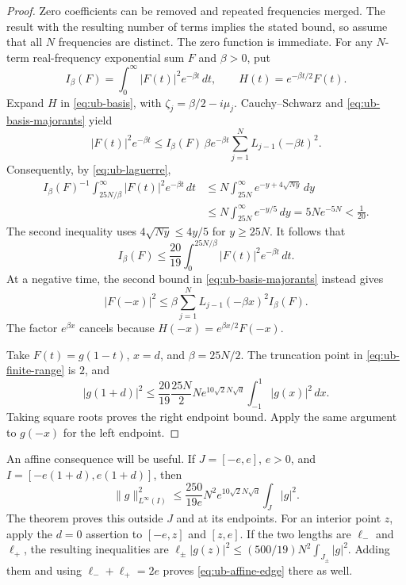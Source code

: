 \begin{proof}
Zero coefficients can be removed and repeated frequencies merged.  The
result with the resulting number of terms implies the stated bound, so
assume that all $N$ frequencies are distinct.  The zero function is
immediate.  For any $N$-term real-frequency exponential sum $F$ and
$\beta>0$, put
\[
 I_\beta(F)=\int_0^\infty|F(t)|^2e^{-\beta t}\,dt,
 \qquad H(t)=e^{-\beta t/2}F(t).
\]
Expand $H$ in \eqref{eq:ub-basis}, with
$\zeta_j=\beta/2-i\mu_j$.  Cauchy--Schwarz and
\eqref{eq:ub-basis-majorants} yield
\[
 |F(t)|^2e^{-\beta t}
 \le I_\beta(F)\,\beta e^{-\beta t}
              \sum_{j=1}^N L_{j-1}(-\beta t)^2.
\]
Consequently, by \eqref{eq:ub-laguerre},
\begin{align*}
 I_\beta(F)^{-1}\int_{25N/\beta}^\infty
             |F(t)|^2e^{-\beta t}\,dt
 &\le N\int_{25N}^\infty e^{-y+4\sqrt{Ny}}\,dy\\
 &\le N\int_{25N}^\infty e^{-y/5}\,dy
   =5Ne^{-5N}<\frac1{20}.
\end{align*}
The second inequality uses $4\sqrt{Ny}\le4y/5$ for $y\ge25N$.
It follows that
\begin{equation}\label{eq:ub-finite-range}
 I_\beta(F)\le\frac{20}{19}
       \int_0^{25N/\beta}|F(t)|^2e^{-\beta t}\,dt.
\end{equation}
At a negative time, the second bound in
\eqref{eq:ub-basis-majorants} instead gives
\[
 |F(-x)|^2\le\beta\sum_{j=1}^N L_{j-1}(-\beta x)^2 I_\beta(F).
\]
The factor $e^{\beta x}$ cancels because
$H(-x)=e^{\beta x/2}F(-x)$.

Take $F(t)=g(1-t)$, $x=d$, and $\beta=25N/2$.  The truncation point
in \eqref{eq:ub-finite-range} is $2$, and
\[
 |g(1+d)|^2
 \le\frac{20}{19}\frac{25N}{2}
       N e^{10\sqrt2N\sqrt d}\int_{-1}^1|g(x)|^2\,dx.
\]
Taking square roots proves the right endpoint bound.  Apply the same
argument to $g(-x)$ for the left endpoint.
\end{proof}

An affine consequence will be useful.  If $J=[-e,e]$, $e>0$, and
$I=[-e(1+d),e(1+d)]$, then
\begin{equation}\label{eq:ub-affine-edge}
 \|g\|_{L^\infty(I)}^2
 \le\frac{250}{19e}N^2e^{10\sqrt2N\sqrt d}
                  \int_J|g|^2.
\end{equation}
The theorem proves this outside $J$ and at its endpoints.  For an interior
point $z$, apply the $d=0$ assertion to $[-e,z]$ and $[z,e]$.  If the
two lengths are $\ell_-$ and $\ell_+$, the resulting inequalities are
$\ell_\pm|g(z)|^2\le(500/19)N^2\int_{J_\pm}|g|^2$.
Adding them and using $\ell_-+\ell_+=2e$ proves
\eqref{eq:ub-affine-edge} there as well.

